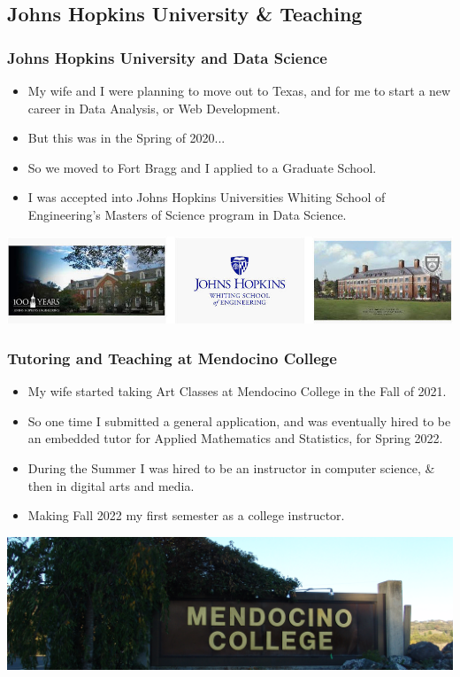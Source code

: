 \documentclass{beamer}
\begin{document}
		\subsection{Johns Hopkins University \& Teaching}
\begin{frame}
	\frametitle{Johns Hopkins University and Data Science}
				\begin{itemize}
		\item My wife and I were planning to move out to Texas, and for me to start a new career in Data Analysis, or Web Development.
\item But this was in the Spring of 2020... 
\item So we moved to Fort Bragg and I applied to a Graduate School.
\item I was accepted into Johns Hopkins Universities Whiting School of Engineering's Masters of Science program in Data Science.
\end{itemize}
\begin{center}
	\includegraphics[width = 1.0\textwidth]{images/Johns_83.jpg}
\end{center}
\end{frame}

\begin{frame}
	\frametitle{Tutoring and Teaching at Mendocino College}
	\begin{itemize}
		\item My wife started taking Art Classes at Mendocino College in the Fall of 2021.  
		\item So one time I submitted a general application, and was eventually hired to be an embedded tutor for Applied Mathematics and Statistics, for Spring 2022.
		\item During the Summer I was hired to be an instructor in computer science, \& then in digital arts and media.
		\item Making Fall 2022 my first semester as a college instructor.  
	\end{itemize}
	\begin{center}
		\includegraphics[width = 1.0\textwidth]{images/MENDOCINO_COLLEGE.png}
	\end{center}
\end{frame}
\end{document}
